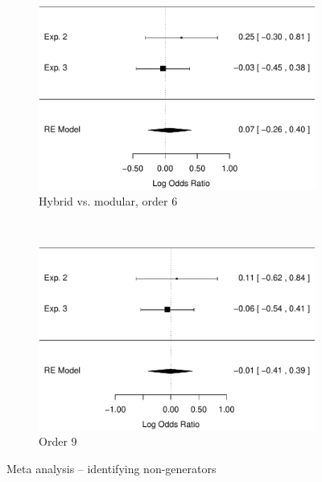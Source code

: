 \documentclass[man,mask,10pt]{apa6}
\begin{document}
\begin{figure}
\begin{subfigure}[c]{0.4\textwidth}
\includegraphics[width=\textwidth]{figures/meta/question_typegenerator_false_6_conditionhybrid.pdf}
\caption{Hybrid vs. modular, order 6}
\end{subfigure}
~
\begin{subfigure}[c]{0.4\textwidth}
\centering
\includegraphics[width=\textwidth]{figures/meta/question_typegenerator_false_9_conditionhybrid.pdf}
\caption{Order 9}
\end{subfigure}
\caption{Meta analysis -- identifying non-generators}
\label{meta_genF}
\end{figure}\noindent 
\FloatBarrier
\end{document}
